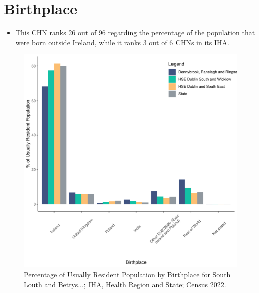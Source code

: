 \documentclass{article}
\begin{document}
\section{Birthplace}\label{sect:Birth}
\begin{itemize}
\item This CHN ranks  26 out of 96 regarding the percentage of the population that were born outside Ireland, while it ranks  3 out of 6 CHNs in its IHA.
\end{itemize}
\begin{figure}[H]
	\centering
	\includegraphics[width = 130mm]{../figures/BirthED.pdf}
	\caption{Percentage of Usually Resident Population by Birthplace for South Louth and Bettys...; IHA, Health Region and State; Census 2022.}
	\label{fig:vbnv}
	\end{figure}
	
\end{document}
